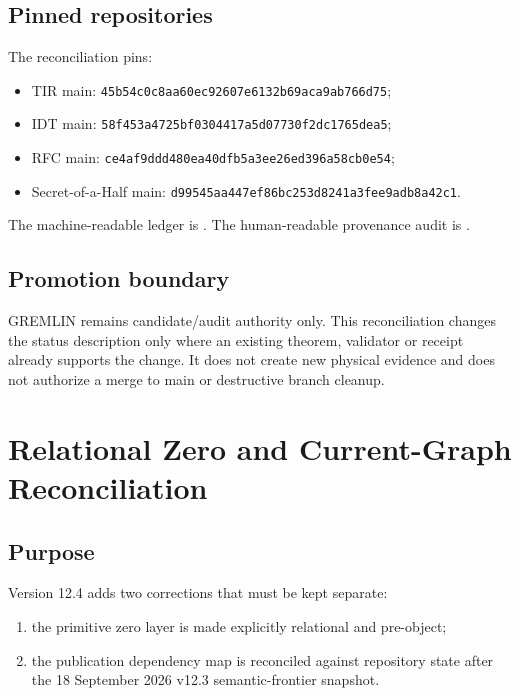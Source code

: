 \documentclass[11pt,a4paper,twoside]{book}
\theoremstyle{definition}
\begin{document}
\section{Pinned repositories}

The reconciliation pins:
\begin{itemize}
\item TIR main: \texttt{45b54c0c8aa60ec92607e6132b69aca9ab766d75};
\item IDT main: \texttt{58f453a4725bf0304417a5d07730f2dc1765dea5};
\item RFC main: \texttt{ce4af9ddd480ea40dfb5a3ee26ed396a58cb0e54};
\item Secret-of-a-Half main:
      \texttt{d99545aa447ef86bc253d8241a3fee9adb8a42c1}.
\end{itemize}

The machine-readable ledger is
.
The human-readable provenance audit is
.

\section{Promotion boundary}

GREMLIN remains candidate/audit authority only. This reconciliation changes the
status description only where an existing theorem, validator or receipt already
supports the change. It does not create new physical evidence and does not
authorize a merge to main or destructive branch cleanup.

\clearpage

\chapter{Relational Zero and Current-Graph Reconciliation}
\label{app:v12_relational_zero_graph_reconciliation}

\section{Purpose}

Version 12.4 adds two corrections that must be kept separate:

\begin{enumerate}
\item the primitive zero layer is made explicitly relational and pre-object;
\item the publication dependency map is reconciled against repository state after the
18 September 2026 v12.3 semantic-frontier snapshot.
\end{enumerate}
\end{document}
